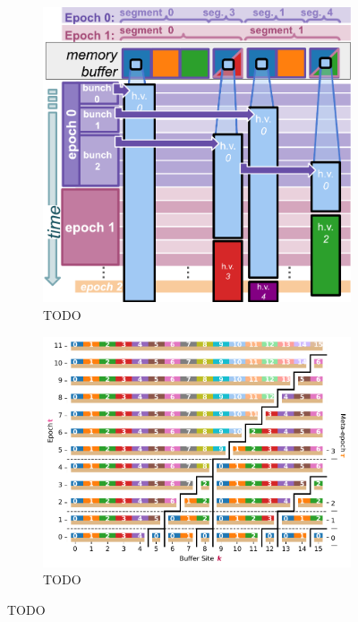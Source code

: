 \begin{figure}
  \centering
\begin{subfigure}{0.43\textwidth}
\includegraphics[width=\textwidth]{img/hsurf-stretched-intuition}
\caption{TODO}
\end{subfigure}%
\begin{subfigure}{0.57\textwidth}
\includegraphics[width=\textwidth]{binder/teeplots/20/surface-size=16+viz=site-reservation-at-ranks-heatmap+ext=}
\caption{TODO}
\end{subfigure}

\end{figure}
